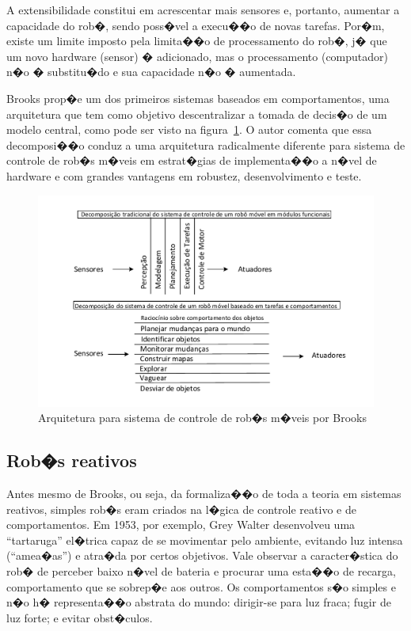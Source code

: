 A extensibilidade constitui em acrescentar mais sensores e,
portanto, aumentar a capacidade do rob�, sendo poss�vel a execu��o de novas
tarefas. Por�m, existe um limite imposto pela limita��o
de processamento do rob�, j� que um novo hardware (sensor) � adicionado, mas o
processamento (computador) n�o � substitu�do e sua capacidade n�o � aumentada.

Brooks prop�e um dos primeiros sistemas baseados em comportamentos, uma
arquitetura que tem como objetivo descentralizar a tomada de decis�o de um
modelo central, como pode ser visto na figura~\ref{BROOKS_1}. O autor comenta
que essa decomposi��o conduz a uma arquitetura radicalmente diferente para
sistema de controle de rob�s m�veis em estrat�gias de implementa��o a n�vel de
hardware e com grandes vantagens em robustez, desenvolvimento e teste.

\begin{figure}[H]
\centering
\includegraphics[width=1\columnwidth]{figs/BROOKS_1.pdf}
\caption{Arquitetura para sistema de controle de rob�s m�veis por Brooks}
\label{BROOKS_1}
\end{figure}

\subsection{Rob�s reativos}
Antes mesmo de Brooks, ou seja, da formaliza��o de toda a teoria em sistemas
reativos, simples rob�s eram criados na l�gica de controle reativo e de
comportamentos. Em 1953, por exemplo, Grey Walter \cite{holland1997grey}
desenvolveu uma ``tartaruga'' el�trica capaz de se movimentar pelo ambiente,
evitando luz intensa (``amea�as'') e atra�da por certos objetivos. Vale
observar a caracter�stica do rob� de perceber baixo n�vel de bateria e procurar
uma esta��o de recarga, comportamento que se sobrep�e aos outros. Os
comportamentos s�o simples e n�o h� representa��o abstrata do mundo:
dirigir-se para luz fraca; fugir de luz forte; e evitar obst�culos.

